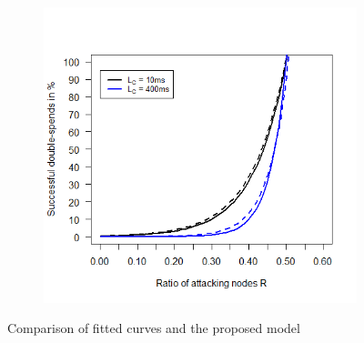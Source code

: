\documentclass[a4paper,12pt,twoside]{report}
\begin{document}
\begin{figure}
\begin{subfigure}{.495\textwidth}
\end{subfigure}
\begin{subfigure}{.495\textwidth}
  \centering
  \includegraphics[width=\linewidth]{Comparison/ConnLatency/conrat.png}
\end{subfigure}
\caption{Comparison of fitted curves and the proposed model}
\label{comp}
\end{figure}
\end{document}

